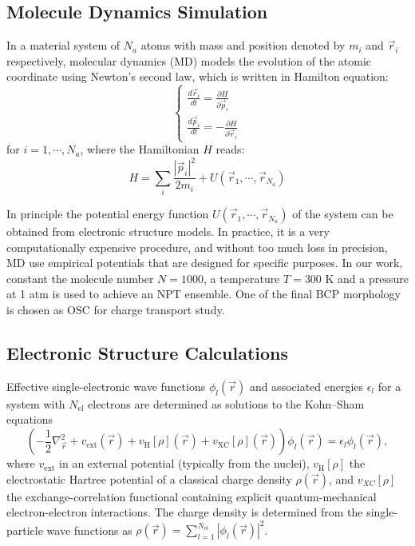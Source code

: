 \documentclass[letterpaper,12pt]{article}
\begin{document}
\subsection{Molecule Dynamics Simulation}
In a material system of $N_a$ atoms with mass and position denoted by $m_i$ and $\vec{r}_i$ respectively, molecular dynamics (MD) models the evolution of the atomic coordinate using Newton's second law, which is written in Hamilton equation: 
\begin{equation}
    \begin{cases}
        \frac{d \vec{r}_i}{dt} = \frac{\partial H }{\partial \vec{p}_i} \\
        \frac{d \vec{p}_i}{dt} = -\frac{\partial H }{\partial \vec{r}_i}
    \end{cases}
    \label{eq:Hamilton}
\end{equation}
for $i=1,\cdots,N_a$, where the Hamiltonian $H$ reads:
\begin{equation}
    H=\sum\limits_{i} \frac{|\vec{p}_i|^2}{2 m_i} + U(\vec{r}_1,\cdots,\vec{r}_{N_a})
    \label{eq:Hamilton2}
\end{equation} 

In principle the potential energy function $U(\vec{r}_1,\cdots,\vec{r}_{N_a})$ of the system can be obtained from electronic structure models. In practice, it is a very computationally expensive procedure, and without too much loss in precision, MD use empirical potentials that are designed for specific purposes.
In our work, constant the molecule number $N=1000$, a temperature $T=300$ K and a pressure at 1 atm is used to achieve an NPT ensemble. 
One of the final BCP morphology is chosen as OSC for charge transport study. 

\subsection{Electronic Structure Calculations} 
Effective single-electronic wave functions $\phi_l (\vec{r})$ and associated energies $\epsilon_l$ for a system with $N_\text{el}$ electrons are determined as solutions to the Kohn--Sham equations~\cite{kohn_self_1965}
%
\begin{equation}
    \left(-\frac{1}{2}\nabla^2_{\vec{r}} + v_\text{ext}(\vec{r}) + v_\text{H}[\rho](\vec{r}) + v_\text{XC}[\rho](\vec{r})\right) \phi_l(\vec{r}) =  \epsilon_l \phi_l (\vec{r}) ,
    \label{eq:KS2}
\end{equation}
%
where $v_\text{ext}$ in an external potential (typically from the nuclei), $v_\text{H}[\rho]$ the electrostatic Hartree potential of a classical charge density $\rho(\vec{r})$, and $v_{XC}[\rho]$ the exchange-correlation functional containing explicit quantum-mechanical electron-electron interactions. The charge density is determined from the single-particle wave functions as $\rho(\vec{r})=\sum\limits_{l=1}^{N_\text{el}} \left\vert\phi_l(\vec{r})\right\vert^2$. 
 
\end{document}
